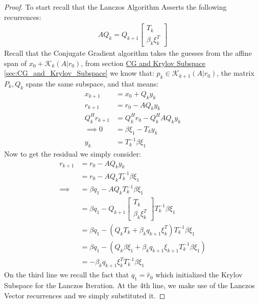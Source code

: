 \documentclass[]{article}
\theoremstyle{definition}
\begin{document}
            \begin{proof}
                To start recall that the Lanczos Algorithm Asserts the following recurrences:
                \begin{align}
                    AQ_k = Q_{k + 1} \begin{bmatrix}
                        T_k
                        \\
                        \beta_k \xi_k^T
                    \end{bmatrix}
                \end{align}
                Recall that the Conjugate Gradient algorithm takes the guesses from the affine span of $x_0 + \mathcal{K}_k(A|r_0)$, from section \hyperref[sec:CG_and_Krylov_Subspace]{CG and Krylov Subspace \ref*{sec:CG_and_Krylov_Subspace}} we know that: $p_k \in \mathcal K_{k + 1}(A|r_0)$, the matrix $P_k, Q_k$ spans the same subspace, and that means: 
                \begin{align}
                    x_{k + 1} &= x_0 + Q_ky_k
                    \\
                    r_{k + 1} &= r_0 - AQ_k y_k
                    \\
                    Q^H_kr_{k + 1} &= Q_k^H r_0 - Q_k^HAQ_k y_k
                    \\
                    \implies
                    0 &= \beta\xi_1 - T_k y_k
                    \\
                    y_k &= T_k^{-1}\beta \xi_1
                \end{align}
                Now to get the residual we simply consider: 
                \begin{align}
                    r_{k + 1} &= r_0 - AQ_k y_k
                    \\
                    &= r_0 - AQ_k T_k^{-1}\beta \xi_1
                    \\
                    \implies
                    &= \beta q_1 - AQ_k T_k^{-1} \beta\xi_1
                    \\
                    &= \beta q_1 - Q_{k + 1}\begin{bmatrix}
                        T_k \\ \beta_k \xi_k^T
                    \end{bmatrix}T_k^{-1} \beta\xi_1
                    \\
                    &= \beta q_1 - 
                    (Q_k T_k + \beta_k q_{k + 1}\xi_k^T)T_k^{-1} \beta\xi_1
                    \\
                    &= 
                    \beta q_1 - (Q_k \beta \xi_1 + \beta_k q_{k + 1}\xi_{k + 1}T_k^{-1}\beta \xi_1)
                    \\
                    &= -\beta_k q_{k + 1}\xi_k^TT_k^{-1} \beta \xi_1
                \end{align}
                On the third line we recall the fact that $q_1 = \hat{r}_0$ which initialized the Krylov Subspace for the Lanczos Iteration. At the 4th line, we make use of the Lanczos Vector recurrences and we simply substituted it.


\end{proof}
\end{document}
